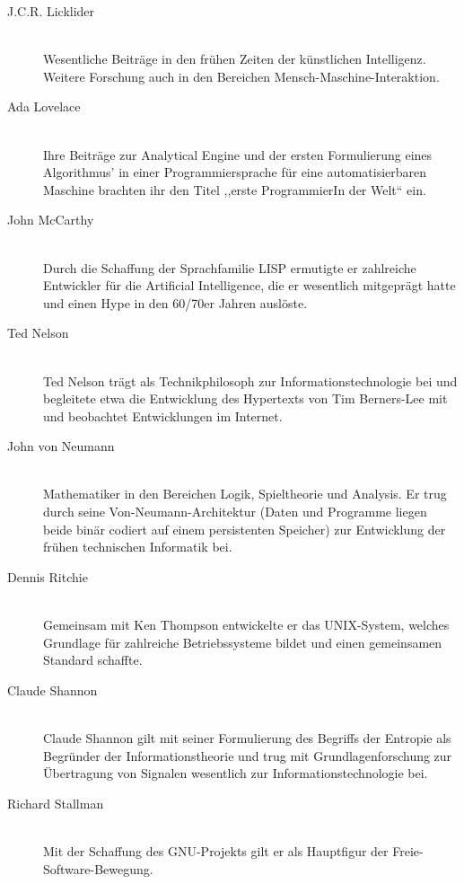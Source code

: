 \begin{description}
  \item[J.C.R. Licklider ] \hfill{} \\
    Wesentliche Beiträge in den frühen Zeiten der künstlichen Intelligenz.
    Weitere Forschung auch in den Bereichen Mensch-Maschine-Interaktion.

  \item[Ada Lovelace ] \hfill{} \\
    Ihre Beiträge zur Analytical Engine und der ersten Formulierung eines Algorithmus' in einer Programmiersprache für eine automatisierbaren Maschine brachten ihr den Titel ,,erste ProgrammierIn der Welt`` ein.

  \item[John McCarthy ] \hfill{} \\
    Durch die Schaffung der Sprachfamilie LISP ermutigte er zahlreiche Entwickler für die Artificial Intelligence, die er wesentlich mitgeprägt hatte und einen Hype in den 60/70er Jahren auslöste.

  \item[Ted Nelson ] \hfill{} \\
    Ted Nelson trägt als Technikphilosoph zur Informationstechnologie bei und begleitete etwa die Entwicklung des Hypertexts von Tim Berners-Lee mit und beobachtet Entwicklungen im Internet.

  \item[John von Neumann ] \hfill{} \\
    Mathematiker in den Bereichen Logik, Spieltheorie und Analysis. Er trug durch seine Von-Neumann-Architektur (Daten und Programme liegen beide binär codiert auf einem persistenten Speicher) zur Entwicklung der frühen technischen Informatik bei.

  \item[Dennis Ritchie ] \hfill{} \\
    Gemeinsam mit Ken Thompson entwickelte er das UNIX-System, welches Grundlage für zahlreiche Betriebssysteme bildet und einen gemeinsamen Standard schaffte.

  \item[Claude Shannon ] \hfill{} \\
    Claude Shannon gilt mit seiner Formulierung des Begriffs der Entropie als Begründer der Informationstheorie und trug mit Grundlagenforschung zur Übertragung von Signalen wesentlich zur Informationstechnologie bei.

  \item[Richard Stallman ] \hfill{} \\
    Mit der Schaffung des GNU-Projekts gilt er als Hauptfigur der Freie-Software-Bewegung.


\end{description}
